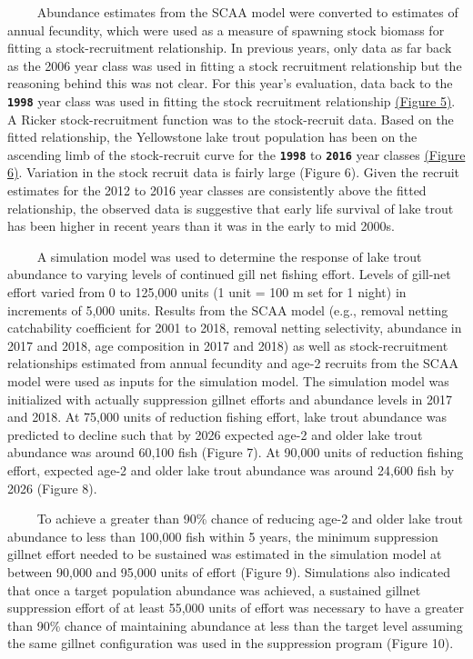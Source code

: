\documentclass[
]{article}
\begin{document}
~~~~ Abundance estimates from the SCAA model were converted to estimates
of annual fecundity, which were used as a measure of spawning stock
biomass for fitting a stock-recruitment relationship. In previous years,
only data as far back as the 2006 year class was used in fitting a stock
recruitment relationship but the reasoning behind this was not clear.
For this year's evaluation, data back to the \textbf{\texttt{1998}} year
class was used in fitting the stock recruitment relationship
\protect\hyperlink{fig5}{(Figure 5)}. A Ricker stock-recruitment
function was to the stock-recruit data. Based on the fitted
relationship, the Yellowstone lake trout population has been on the
ascending limb of the stock-recruit curve for the \textbf{\texttt{1998}}
to \textbf{\texttt{2016}} year classes \protect\hyperlink{fig6}{(Figure
6)}. Variation in the stock recruit data is fairly large (Figure 6).
Given the recruit estimates for the 2012 to 2016 year classes are
consistently above the fitted relationship, the observed data is
suggestive that early life survival of lake trout has been higher in
recent years than it was in the early to mid 2000s.

~~~~ A simulation model was used to determine the response of lake trout
abundance to varying levels of continued gill net fishing effort. Levels
of gill-net effort varied from 0 to 125,000 units (1 unit = 100 m set
for 1 night) in increments of 5,000 units. Results from the SCAA model
(e.g., removal netting catchability coefficient for 2001 to 2018,
removal netting selectivity, abundance in 2017 and 2018, age composition
in 2017 and 2018) as well as stock-recruitment relationships estimated
from annual fecundity and age-2 recruits from the SCAA model were used
as inputs for the simulation model. The simulation model was initialized
with actually suppression gillnet efforts and abundance levels in 2017
and 2018. At 75,000 units of reduction fishing effort, lake trout
abundance was predicted to decline such that by 2026 expected age-2 and
older lake trout abundance was around 60,100 fish (Figure 7). At 90,000
units of reduction fishing effort, expected age-2 and older lake trout
abundance was around 24,600 fish by 2026 (Figure 8).

~~~~ To achieve a greater than 90\% chance of reducing age-2 and older
lake trout abundance to less than 100,000 fish within 5 years, the
minimum suppression gillnet effort needed to be sustained was estimated
in the simulation model at between 90,000 and 95,000 units of effort
(Figure 9). Simulations also indicated that once a target population
abundance was achieved, a sustained gillnet suppression effort of at
least 55,000 units of effort was necessary to have a greater than 90\%
chance of maintaining abundance at less than the target level assuming
the same gillnet configuration was used in the suppression program
(Figure 10).
\end{document}
